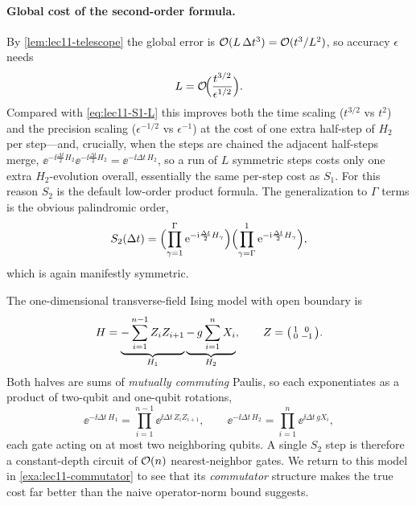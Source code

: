\paragraph{Global cost of the second-order formula.}
By \cref{lem:lec11-telescope} the global error is
$\mathcal{O}(L\,\Delta t^3)=\mathcal{O}(t^3/L^2)$, so accuracy $\epsilon$ needs
\begin{equation}
  L=\mathcal{O}\!\Bigl(\frac{t^{3/2}}{\epsilon^{1/2}}\Bigr).
  \label{eq:lec11-S2-L}
\end{equation}
Compared with \eqref{eq:lec11-S1-L} this improves both the time scaling ($t^{3/2}$ vs
$t^2$) and the precision scaling ($\epsilon^{-1/2}$ vs $\epsilon^{-1}$) at the cost of one
extra half-step of $H_2$ per step---and, crucially, when the steps are chained the
adjacent half-steps merge, $\ee^{-\ii\frac{\Delta t}{2}H_2}\ee^{-\ii\frac{\Delta t}{2}H_2}
=\ee^{-\ii\Delta t\,H_2}$, so a run of $L$ symmetric steps costs only one extra
$H_2$-evolution overall, essentially the same per-step cost as $S_1$. For this reason
$S_2$ is the default low-order product formula. The generalization to $\Gamma$ terms is
the obvious palindromic order,
\begin{equation}
  S_2(\Delta t)=\Bigl(\prod_{\gamma=1}^{\Gamma}\mathrm{e}^{-\mathrm{i}\frac{\Delta t}{2}H_\gamma}\Bigr)
  \Bigl(\prod_{\gamma=\Gamma}^{1}\mathrm{e}^{-\mathrm{i}\frac{\Delta t}{2}H_\gamma}\Bigr),
  \label{eq:lec11-S2-multi}
\end{equation}
which is again manifestly symmetric.

\begin{example}
\label{exa:lec11-tfim}
The one-dimensional transverse-field Ising model with open boundary is
\begin{equation}
  H=\underbrace{-\sum_{i=1}^{n-1}Z_iZ_{i+1}}_{H_1}
    \underbrace{-\,g\sum_{i=1}^{n}X_i}_{H_2},\qquad
  Z=\begin{psmallmatrix}1&0\\0&-1\end{psmallmatrix}.
\end{equation}
Both halves are sums of \emph{mutually commuting} Paulis, so each exponentiates as a
product of two-qubit and one-qubit rotations,
\begin{equation}
  \ee^{-\ii\Delta t\,H_1}=\prod_{i=1}^{n-1}\ee^{\ii\Delta t\,Z_iZ_{i+1}},\qquad
  \ee^{-\ii\Delta t\,H_2}=\prod_{i=1}^{n}\ee^{\ii\Delta t\,g X_i},
\end{equation}
each gate acting on at most two neighboring qubits. A single $S_2$ step is therefore a
constant-depth circuit of $\mathcal{O}(n)$ nearest-neighbor gates. We return to this model in
\cref{exa:lec11-commutator} to see that its \emph{commutator} structure makes the true
cost far better than the naive operator-norm bound suggests.
\end{example}

